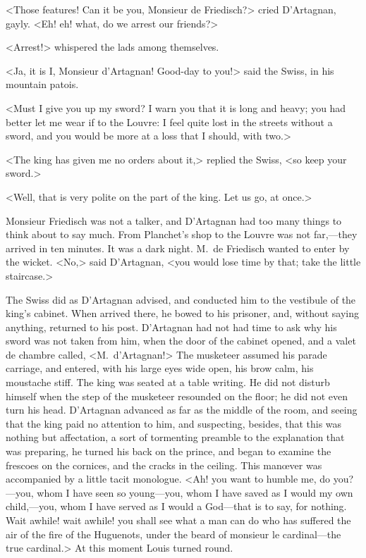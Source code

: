 <Those features! Can it be you, Monsieur de Friedisch?> cried D'Artagnan, gayly. <Eh! eh! what, do we arrest our friends?>

<Arrest!> whispered the lads among themselves.

<Ja, it is I, Monsieur d'Artagnan! Good-day to you!> said the Swiss, in his mountain patois.

<Must I give you up my sword? I warn you that it is long and heavy; you had better let me wear if to the Louvre: I feel quite lost in the streets without a sword, and you would be more at a loss that I should, with two.>

<The king has given me no orders about it,> replied the Swiss, <so keep your sword.>

<Well, that is very polite on the part of the king. Let us go, at once.>

Monsieur Friedisch was not a talker, and D'Artagnan had too many things to think about to say much. From Planchet's shop to the Louvre was not far,—they arrived in ten minutes. It was a dark night. M.~de Friedisch wanted to enter by the wicket. <No,> said D'Artagnan, <you would lose time by that; take the little staircase.>

The Swiss did as D'Artagnan advised, and conducted him to the vestibule of the king's cabinet. When arrived there, he bowed to his prisoner, and, without saying anything, returned to his post. D'Artagnan had not had time to ask why his sword was not taken from him, when the door of the cabinet opened, and a valet de chambre called, <M.~d'Artagnan!> The musketeer assumed his parade carriage, and entered, with his large eyes wide open, his brow calm, his moustache stiff. The king was seated at a table writing. He did not disturb himself when the step of the musketeer resounded on the floor; he did not even turn his head. D'Artagnan advanced as far as the middle of the room, and seeing that the king paid no attention to him, and suspecting, besides, that this was nothing but affectation, a sort of tormenting preamble to the explanation that was preparing, he turned his back on the prince, and began to examine the frescoes on the cornices, and the cracks in the ceiling. This manœver was accompanied by a little tacit monologue. <Ah! you want to humble me, do you?—you, whom I have seen so young—you, whom I have saved as I would my own child,—you, whom I have served as I would a God—that is to say, for nothing. Wait awhile! wait awhile! you shall see what a man can do who has suffered the air of the fire of the Huguenots, under the beard of monsieur le cardinal—the true cardinal.> At this moment Louis turned round.

